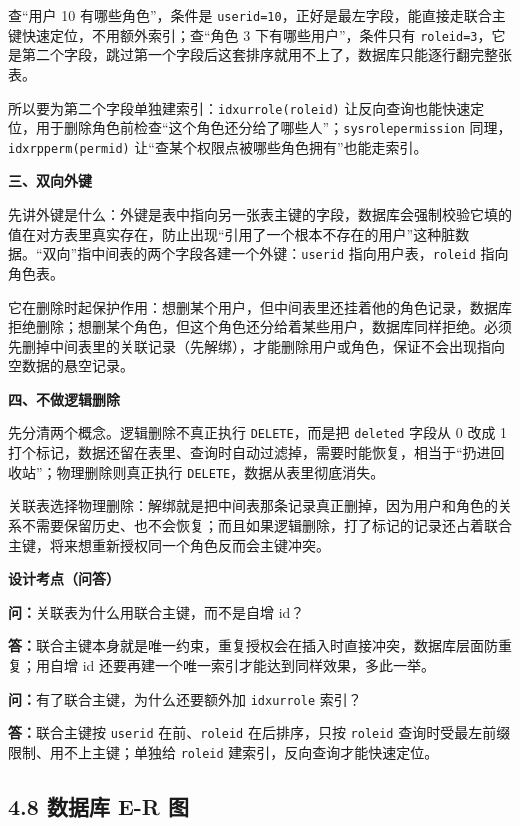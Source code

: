 \documentclass[zihao=-4,UTF8,openany]{ctexart}
\renewcommand{\_}{\textunderscore\allowbreak}
\begin{document}
查“用户 10 有哪些角色”，条件是 \texttt{user\_id=10}，正好是最左字段，能直接走联合主键快速定位，不用额外索引；查“角色 3 下有哪些用户”，条件只有 \texttt{role\_id=3}，它是第二个字段，跳过第一个字段后这套排序就用不上了，数据库只能逐行翻完整张表。

所以要为第二个字段单独建索引：\texttt{idx\_ur\_role(role\_id)} 让反向查询也能快速定位，用于删除角色前检查“这个角色还分给了哪些人”；\texttt{sys\_role\_permission} 同理，\texttt{idx\_rp\_perm(perm\_id)} 让“查某个权限点被哪些角色拥有”也能走索引。

\noindent\textbf{三、双向外键}

先讲外键是什么：外键是表中指向另一张表主键的字段，数据库会强制校验它填的值在对方表里真实存在，防止出现“引用了一个根本不存在的用户”这种脏数据。“双向”指中间表的两个字段各建一个外键：\texttt{user\_id} 指向用户表，\texttt{role\_id} 指向角色表。

它在删除时起保护作用：想删某个用户，但中间表里还挂着他的角色记录，数据库拒绝删除；想删某个角色，但这个角色还分给着某些用户，数据库同样拒绝。必须先删掉中间表里的关联记录（先解绑），才能删除用户或角色，保证不会出现指向空数据的悬空记录。

\noindent\textbf{四、不做逻辑删除}

先分清两个概念。逻辑删除不真正执行 \texttt{DELETE}，而是把 \texttt{deleted} 字段从 0 改成 1 打个标记，数据还留在表里、查询时自动过滤掉，需要时能恢复，相当于“扔进回收站”；物理删除则真正执行 \texttt{DELETE}，数据从表里彻底消失。

关联表选择物理删除：解绑就是把中间表那条记录真正删掉，因为用户和角色的关系不需要保留历史、也不会恢复；而且如果逻辑删除，打了标记的记录还占着联合主键，将来想重新授权同一个角色反而会主键冲突。

\noindent\textbf{设计考点（问答）}

\noindent\textbf{问：}关联表为什么用联合主键，而不是自增 id？

\noindent\textbf{答：}联合主键本身就是唯一约束，重复授权会在插入时直接冲突，数据库层面防重复；用自增 id 还要再建一个唯一索引才能达到同样效果，多此一举。

\noindent\textbf{问：}有了联合主键，为什么还要额外加 \texttt{idx\_ur\_role} 索引？

\noindent\textbf{答：}联合主键按 \texttt{user\_id} 在前、\texttt{role\_id} 在后排序，只按 \texttt{role\_id} 查询时受最左前缀限制、用不上主键；单独给 \texttt{role\_id} 建索引，反向查询才能快速定位。


\subsection*{\texorpdfstring{\textbf{4.8 数据库 E-R 图}}{4.8 数据库 E-R 图}}\label{ux6570ux636eux5e93-e-r-ux56fe}
\end{document}
